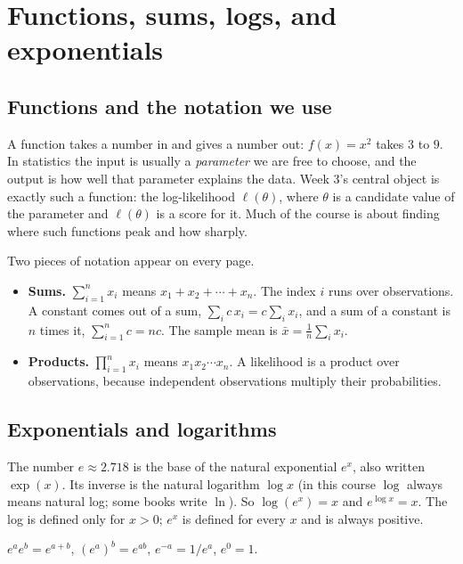 \documentclass[11pt]{article}
\theoremstyle{definition}
\newcommand{\loglik}{\ell}
\begin{document}
\section{Functions, sums, logs, and exponentials}
\label{sec:functions}

\subsection{Functions and the notation we use}

A function takes a number in and gives a number out: $f(x) = x^2$ takes $3$
to $9$. In statistics the input is usually a \emph{parameter} we are free to
choose, and the output is how well that parameter explains the data. Week 3's
central object is exactly such a function: the log-likelihood
$\loglik(\theta)$, where $\theta$ is a candidate value of the parameter and
$\loglik(\theta)$ is a score for it. Much of the course is about finding
where such functions peak and how sharply.

Two pieces of notation appear on every page.
\begin{itemize}
  \item \textbf{Sums.} $\sum_{i=1}^{n} x_i$ means $x_1 + x_2 + \cdots + x_n$.
        The index $i$ runs over observations. A constant comes out of a sum,
        $\sum_i c\,x_i = c \sum_i x_i$, and a sum of a constant is $n$ times
        it, $\sum_{i=1}^n c = nc$. The sample mean is $\bar x =
        \frac1n\sum_i x_i$.
  \item \textbf{Products.} $\prod_{i=1}^{n} x_i$ means $x_1 x_2 \cdots x_n$.
        A likelihood is a product over observations, because independent
        observations multiply their probabilities.
\end{itemize}

\subsection{Exponentials and logarithms}

The number $e \approx 2.718$ is the base of the natural exponential $e^x$,
also written $\exp(x)$. Its inverse is the natural logarithm $\log x$ (in
this course $\log$ always means natural log; some books write $\ln$). So
$\log(e^x) = x$ and $e^{\log x} = x$. The log is defined only for $x > 0$;
$e^x$ is defined for every $x$ and is always positive.

\begin{rulebox}[exponents]
$e^{a}e^{b} = e^{a+b}$, \quad $(e^{a})^{b} = e^{ab}$, \quad $e^{-a} = 1/e^{a}$,
\quad $e^0 = 1$.
\end{rulebox}
\end{document}
